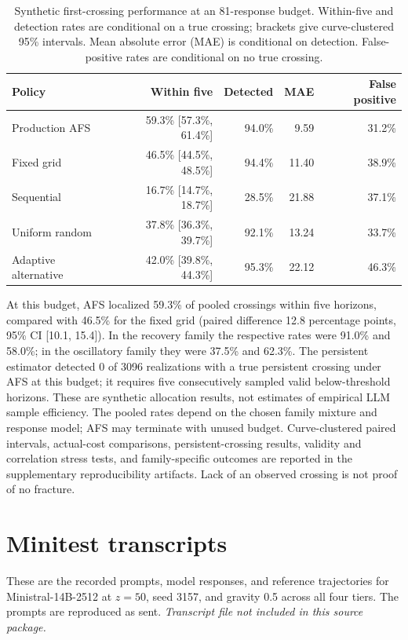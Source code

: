 \documentclass{article}
\begin{document}
\begin{table}[H]
\centering
\caption{Synthetic first-crossing performance at an 81-response budget. Within-five and detection rates are conditional on a true crossing; brackets give curve-clustered 95\% intervals. Mean absolute error (MAE) is conditional on detection. False-positive rates are conditional on no true crossing.}
\label{tab:afs_simulation}
\scriptsize
\begin{tabular}{lrrrr}
\toprule
Policy & Within five & Detected & MAE & False positive \\
\midrule
Production AFS & 59.3\% [57.3\%, 61.4\%] & 94.0\% & 9.59 & 31.2\% \\
Fixed grid & 46.5\% [44.5\%, 48.5\%] & 94.4\% & 11.40 & 38.9\% \\
Sequential & 16.7\% [14.7\%, 18.7\%] & 28.5\% & 21.88 & 37.1\% \\
Uniform random & 37.8\% [36.3\%, 39.7\%] & 92.1\% & 13.24 & 33.7\% \\
Adaptive alternative & 42.0\% [39.8\%, 44.3\%] & 95.3\% & 22.12 & 46.3\% \\
\bottomrule
\end{tabular}
\end{table}

At this budget, AFS localized 59.3\% of pooled crossings within five horizons, compared with 46.5\% for the fixed grid (paired difference 12.8 percentage points, 95\% CI [10.1, 15.4]). In the recovery family the respective rates were 91.0\% and 58.0\%; in the oscillatory family they were 37.5\% and 62.3\%. The persistent estimator detected 0 of 3096 realizations with a true persistent crossing under AFS at this budget; it requires five consecutively sampled valid below-threshold horizons. These are synthetic allocation results, not estimates of empirical LLM sample efficiency. The pooled rates depend on the chosen family mixture and response model; AFS may terminate with unused budget. Curve-clustered paired intervals, actual-cost comparisons, persistent-crossing results, validity and correlation stress tests, and family-specific outcomes are reported in the supplementary reproducibility artifacts. Lack of an observed crossing is not proof of no fracture.

\section{Minitest transcripts}
These are the recorded prompts, model responses, and reference trajectories for
Ministral-14B-2512 at $z=50$, seed 3157, and gravity 0.5 across all four tiers.
The prompts are reproduced as sent.
  {}
  {\noindent\emph{Transcript file not included in this source package.}}
\end{document}
